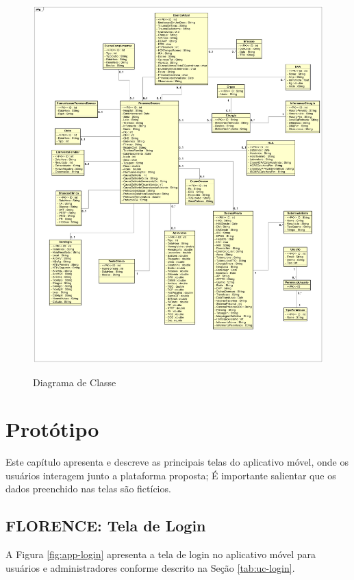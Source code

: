 \documentclass[portuguese,oneside]{tcc}
\begin{document}
\begin{figure}[htp]
\centering
\caption{Diagrama de Classe}
\includegraphics[width=15cm]{class-diagram}
\label{fig:erDiagram}
\end{figure}

\chapter{Protótipo}
Este capítulo apresenta e descreve as principais telas do aplicativo móvel, onde os usuários interagem junto a plataforma proposta; É importante salientar que os dados preenchido nas telas são fictícios.

\section{FLORENCE: Tela de Login}
A Figura \ref{fig:app-login} apresenta a tela de login no aplicativo móvel para usuários e administradores conforme descrito na Seção \ref{tab:uc-login}.
\end{document}
